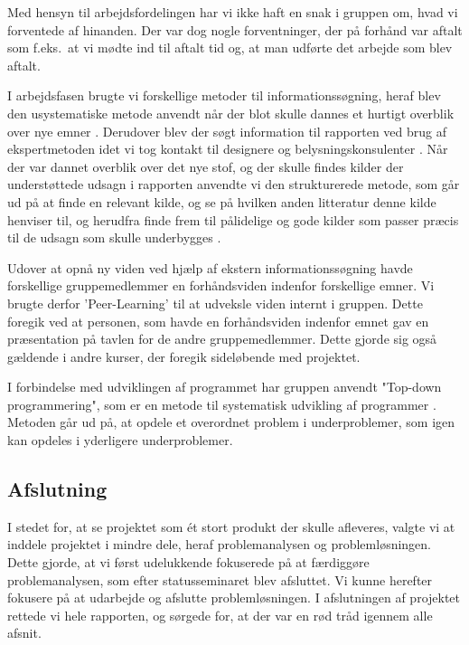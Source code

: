 \documentclass[oneside,a4paper,titlepage]{article}
\begin{document}
Med hensyn til arbejdsfordelingen har vi ikke haft en snak i gruppen om, hvad vi forventede af hinanden. Der var dog nogle forventninger, der på forhånd var aftalt som f.eks.\ at vi mødte ind til aftalt tid og, at man udførte det arbejde som blev aftalt. 

I arbejdsfasen brugte vi forskellige metoder til informationssøgning, heraf blev den usystematiske metode anvendt når der blot skulle dannes et hurtigt overblik over nye emner \cite{SO_bog}. Derudover blev der søgt information til rapporten ved brug af ekspertmetoden idet vi tog kontakt til designere og belysningskonsulenter \cite{SO_bog}. Når der var dannet overblik over det nye stof, og der skulle findes kilder der understøttede udsagn i rapporten anvendte vi den strukturerede metode, som går ud på at finde en relevant kilde, og se på hvilken anden litteratur denne kilde henviser til, og herudfra finde frem til pålidelige og gode kilder som passer præcis til de udsagn som skulle underbygges \cite{SO_bog}. 

Udover at opnå ny viden ved hjælp af ekstern informationssøgning havde forskellige gruppemedlemmer en forhåndsviden indenfor forskellige emner. Vi brugte derfor 'Peer-Learning' til at udveksle viden internt i gruppen. Dette foregik ved at personen, som havde en forhåndsviden indenfor emnet gav en præsentation på tavlen for de andre gruppemedlemmer. Dette gjorde sig også gældende i andre kurser, der foregik sideløbende med projektet.

I forbindelse med udviklingen af programmet har gruppen anvendt "Top-down programmering", som er en metode til systematisk udvikling af programmer \cite{top_down_programming}. Metoden går ud på, at opdele et overordnet problem i underproblemer, som igen kan opdeles i yderligere underproblemer.

\subsection{Afslutning}

I stedet for, at se projektet som ét stort produkt der skulle afleveres, valgte vi at inddele projektet i mindre dele, heraf problemanalysen og problemløsningen. Dette gjorde, at vi først udelukkende fokuserede på at færdiggøre problemanalysen, som efter statusseminaret blev afsluttet. Vi kunne herefter fokusere på at udarbejde og afslutte problemløsningen. 
I afslutningen af projektet rettede vi hele rapporten, og sørgede for, at der var en rød tråd igennem alle afsnit.
\end{document}
